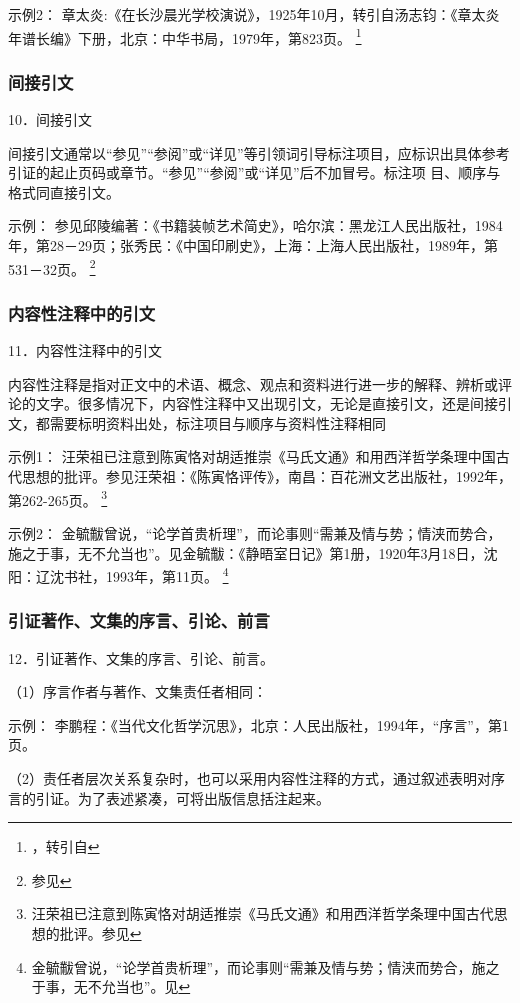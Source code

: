 \documentclass{article}
\begin{document}
示例2：
章太炎:《在长沙晨光学校演说》，1925年10月，转引自汤志钧：《章太炎年谱长编》下册，北京：中华书局，1979年，第823页。
\footnote{，转引自}


\subsubsection{间接引文}
10．间接引文

间接引文通常以“参见”“参阅”或“详见”等引领词引导标注项目，应标识出具体参考引证的起止页码或章节。“参见”“参阅”或“详见”后不加冒号。标注项
目、顺序与格式同直接引文。

示例：
参见邱陵编著：《书籍装帧艺术简史》，哈尔滨：黑龙江人民出版社，1984年，第28－29页；张秀民：《中国印刷史》，上海：上海人民出版社，1989年，第531－32页。
\footnote{参见}


\subsubsection{内容性注释中的引文}
11．内容性注释中的引文

内容性注释是指对正文中的术语、概念、观点和资料进行进一步的解释、辨析或评论的文字。很多情况下，内容性注释中又出现引文，无论是直接引文，还是间接引
文，都需要标明资料出处，标注项目与顺序与资料性注释相同

示例1：
汪荣祖已注意到陈寅恪对胡适推崇《马氏文通》和用西洋哲学条理中国古代思想的批评。参见汪荣祖：《陈寅恪评传》，南昌：百花洲文艺出版社，1992年，第262-265页。
\footnote{汪荣祖已注意到陈寅恪对胡适推崇《马氏文通》和用西洋哲学条理中国古代思想的批评。参见}

示例2：
金毓黻曾说，“论学首贵析理”，而论事则“需兼及情与势；情浃而势合，施之于事，无不允当也”。见金毓黻：《静晤室日记》第1册，1920年3月18日，沈阳：辽沈书社，1993年，第11页。
\footnote{金毓黻曾说，“论学首贵析理”，而论事则“需兼及情与势；情浃而势合，施之于事，无不允当也”。见}


\subsubsection{引证著作、文集的序言、引论、前言}
12．引证著作、文集的序言、引论、前言。

（1）序言作者与著作、文集责任者相同：

示例：
李鹏程：《当代文化哲学沉思》，北京：人民出版社，1994年，“序言”，第1页。


（2）责任者层次关系复杂时，也可以采用内容性注释的方式，通过叙述表明对序言的引证。为了表述紧凑，可将出版信息括注起来。
\end{document}
